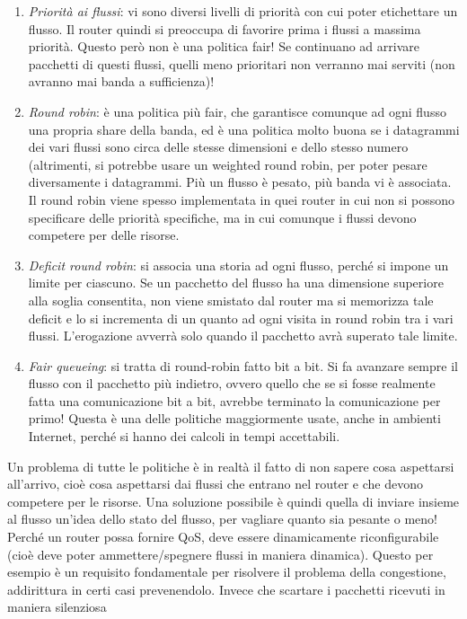 \begin{enumerate}
 \item \textit{Priorità ai flussi}: vi sono diversi livelli di priorità con cui poter etichettare un flusso. Il router
 quindi si preoccupa di favorire prima i flussi a massima priorità. Questo però non è una politica fair! Se continuano
 ad arrivare pacchetti di questi flussi, quelli meno prioritari non verranno mai serviti (non avranno mai banda a
 sufficienza)!
 \item \textit{Round robin}: è una politica più fair, che garantisce comunque ad ogni flusso una propria share della
 banda, ed è una politica molto buona se i datagrammi dei vari flussi sono circa delle stesse dimensioni e dello stesso numero (altrimenti,
 si potrebbe usare un weighted round robin, per poter pesare diversamente i datagrammi. Più un flusso è pesato,
 più banda vi è associata. Il round  robin viene spesso implementata in quei router in cui non si possono specificare delle priorità specifiche, ma in cui comunque i flussi devono competere per delle risorse.
 \item \textit{Deficit round robin}: si associa una storia ad ogni flusso, perché si impone un limite per ciascuno.
 Se un pacchetto del flusso ha una dimensione superiore alla soglia consentita, non viene smistato dal router ma si memorizza tale deficit e lo si incrementa di un quanto ad ogni visita in round robin tra i vari flussi. L'erogazione avverrà solo quando il pacchetto avrà superato tale limite.
 \item \textit{Fair queueing}: si tratta di round-robin fatto bit a bit. Si fa avanzare sempre il flusso con il
 pacchetto più indietro, ovvero quello che se si fosse realmente fatta una comunicazione bit a bit, avrebbe terminato
 la comunicazione per primo! Questa è una delle politiche maggiormente usate, anche in ambienti Internet, perché si
 hanno dei calcoli in tempi accettabili.
\end{enumerate}
Un problema di tutte le politiche è in realtà il fatto di non sapere cosa aspettarsi all'arrivo, cioè cosa aspettarsi
dai flussi che entrano nel router e che devono competere per le risorse. Una soluzione possibile è quindi quella di
inviare insieme al flusso un'idea dello stato del flusso, per vagliare quanto sia pesante o meno!
Perché un router possa fornire QoS, deve essere dinamicamente riconfigurabile (cioè deve poter ammettere/spegnere
flussi in maniera dinamica). Questo per esempio è un requisito fondamentale per risolvere il problema della
congestione, addirittura in certi casi prevenendolo. Invece che scartare i pacchetti ricevuti in maniera silenziosa

